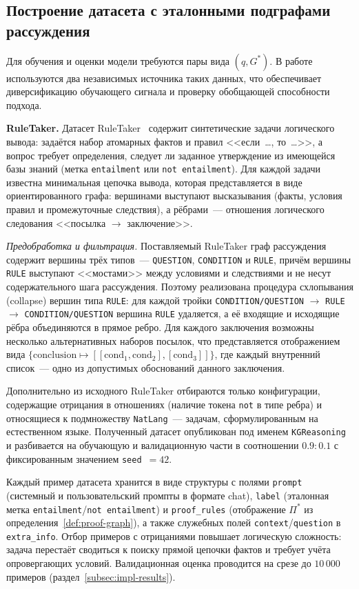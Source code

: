 \subsection{Построение датасета с эталонными подграфами рассуждения}
\label{subsec:dataset-construction}

Для обучения и оценки модели требуются пары вида $(q, G^*)$. В работе используются два независимых источника таких данных, что обеспечивает диверсификацию обучающего сигнала и проверку обобщающей способности подхода.

\textbf{RuleTaker.} Датасет RuleTaker~\cite{clark2020ruletaker} содержит синтетические задачи логического вывода: задаётся набор атомарных фактов и правил <<если~\ldots, то~\ldots>>, а вопрос требует определения, следует ли заданное утверждение из имеющейся базы знаний (метка \texttt{entailment} или \texttt{not entailment}). Для каждой задачи известна минимальная цепочка вывода, которая представляется в виде ориентированного графа: вершинами выступают высказывания (факты, условия правил и промежуточные следствия), а рёбрами~--- отношения логического следования <<посылка $\rightarrow$ заключение>>.

\textit{Предобработка и фильтрация.} Поставляемый RuleTaker граф рассуждения содержит вершины трёх типов~--- \texttt{QUESTION}, \texttt{CONDITION} и \texttt{RULE}, причём вершины \texttt{RULE} выступают <<мостами>> между условиями и следствиями и не несут содержательного шага рассуждения. Поэтому реализована процедура схлопывания (collapse) вершин типа \texttt{RULE}: для каждой тройки \texttt{CONDITION/QUESTION} $\rightarrow$ \texttt{RULE} $\rightarrow$ \texttt{CONDITION/QUESTION} вершина \texttt{RULE} удаляется, а её входящие и исходящие рёбра объединяются в прямое ребро. Для каждого заключения возможны несколько альтернативных наборов посылок, что представляется отображением вида $\{\text{conclusion} \mapsto [[\text{cond}_1, \text{cond}_2], [\text{cond}_3]]\}$, где каждый внутренний список~--- одно из допустимых обоснований данного заключения.

Дополнительно из исходного RuleTaker отбираются только конфигурации, содержащие отрицания в отношениях (наличие токена \texttt{not} в типе ребра) и относящиеся к подмножеству \texttt{NatLang}~--- задачам, сформулированным на естественном языке. Полученный датасет опубликован под именем \texttt{KGReasoning} и разбивается на обучающую и валидационную части в соотношении $0{.}9{:}0{.}1$ с фиксированным значением \texttt{seed}~$=42$.

Каждый пример датасета хранится в виде структуры с полями \texttt{prompt} (системный и пользовательский промпты в формате chat), \texttt{label} (эталонная метка \texttt{entailment}/\texttt{not entailment}) и \texttt{proof\_rules} (отображение $\Pi^*$ из определения~\ref{def:proof-graph}), а также служебных полей \texttt{context}/\texttt{question} в \texttt{extra\_info}. Отбор примеров с отрицаниями повышает логическую сложность: задача перестаёт сводиться к поиску прямой цепочки фактов и требует учёта опровергающих условий. Валидационная оценка проводится на срезе до $10\,000$ примеров (раздел~\ref{subsec:impl-results}).

